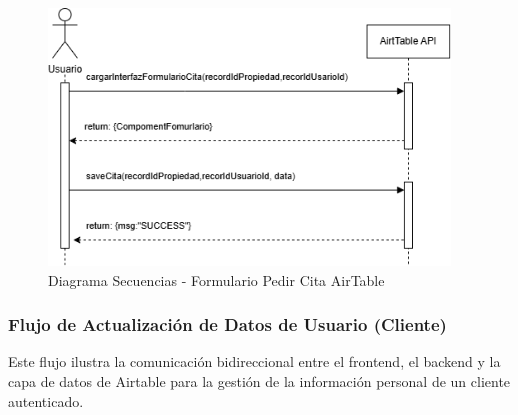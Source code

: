 \begin{figure}[H]
    \begin{center}
        \includegraphics[width = 0.95\textwidth]{Figuras/diagramasecuenciasformulariopedircitaairtable.png}
    \end{center}
    \caption{\label{fig:diagramasecuenciasformulariopedircitaairtable} Diagrama Secuencias - Formulario Pedir Cita AirTable}
\end{figure}


\subsubsection{Flujo de Actualización de Datos de Usuario (Cliente)}


Este flujo ilustra la comunicación bidireccional entre el frontend, el backend y la capa de datos de Airtable para la gestión de la información personal de un cliente autenticado.


